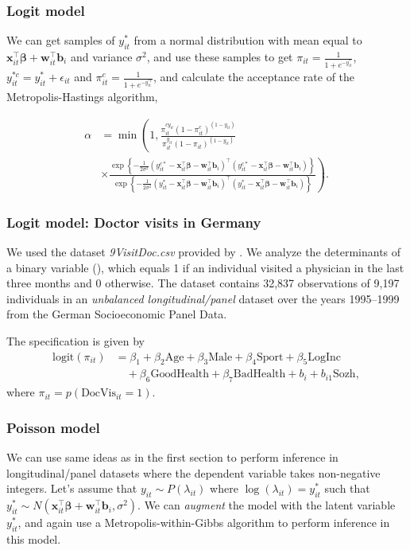 \documentclass[12pt, compress]{beamer}
\begin{document}
\begin{frame}
	\frametitle{Logit model}
We can get samples of $y_{it}^*$ from a normal distribution with mean equal to $\bm{x}_{it}^{\top}\bm{\beta}+\bm{w}_{it}^{\top}\bm{b}_i$ and variance $\sigma^2$, and use these samples to get $\pi_{it}=\frac{1}{1+e^{-y_{it}^*}}$, $y_{it}^{*c}=y_{it}^{*}+\epsilon_{it}$ and $\pi_{it}^c=\frac{1}{1+e^{-y_{it}^{*c}}}$, and calculate the acceptance rate of the Metropolis-Hastings algorithm, 

\begin{align*}
	\alpha&=\min\left(1,\frac{ \pi_{it}^{cy_{it}}(1-\pi_{it}^c)^{(1-y_{it})}}{\pi_{it}^{y_{it}}(1-\pi_{it})^{(1-y_{it})}}\right.\\
	&\times \left. \frac{\exp\left\{-\frac{1}{2\sigma^2}(y_{it}^{c*}-\bm{x}_{it}^{\top}\bm{\beta}-\bm{w}_{it}^{\top}\bm{b}_i)^{\top}(y_{it}^{c*}-\bm{x}_{it}^{\top}\bm{\beta}-\bm{w}_{it}^{\top}\bm{b}_i)\right\}}{\exp\left\{-\frac{1}{2\sigma^2}(y_{it}^{*}-\bm{x}_{it}^{\top}\bm{\beta}-\bm{w}_{it}^{\top}\bm{b}_i)^{\top}(y_{it}^{*}-\bm{x}_{it}^{\top}\bm{\beta}-\bm{w}_{it}^{\top}\bm{b}_i)\right\}}\right).
\end{align*}


\end{frame}

\begin{frame}
	\frametitle{Logit model: Doctor visits in Germany}
We used the dataset \textit{9VisitDoc.csv} provided by \cite{Winkelmann2004}. We analyze the determinants of a binary variable (), which equals 1 if an individual visited a physician in the last three months and 0 otherwise. The dataset contains 32,837 observations of 9,197 individuals in an \textit{unbalanced longitudinal/panel} dataset over the years 1995--1999 from the German Socioeconomic Panel Data.

The specification is given by
\begin{align*}
	\text{logit}(\pi_{it}) &= \beta_1 + \beta_2 \text{Age} + \beta_3 \text{Male} + \beta_4 \text{Sport} + \beta_5 \text{LogInc} \\
	&\quad + \beta_6 \text{GoodHealth} + \beta_7 \text{BadHealth} + b_i + b_{i1} \text{Sozh},
\end{align*}
where $\pi_{it} = p(\text{DocVis}_{it} = 1)$.
\end{frame}

\begin{frame}
\frametitle{Poisson model}
We can use same ideas as in the first section to perform inference in longitudinal/panel datasets where the dependent variable takes non-negative integers. Let's assume that $y_{it}\sim P(\lambda_{it})$ where $\log(\lambda_{it})=y_{it}^*$ such that $y_{it}^*\sim N(\bm{x}_{it}^{\top}\bm{\beta}+\bm{w}_{it}^{\top}\bm{b}_i,\sigma^2)$. We can \textit{augment} the model with the latent variable $y_{it}^{*}$, and again use a Metropolis-within-Gibbs algorithm to perform inference in this model.
\end{frame}
\end{document}
